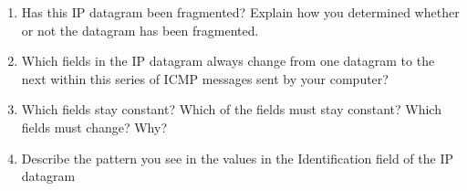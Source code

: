 \begin{enumerate}[label=\bfseries Problem \arabic*:,leftmargin=*,labelindent=1em]
        \item Has this IP datagram been fragmented? 
        Explain how you determined whether or not the datagram has been fragmented.\\[0.2mm]
        \soln
        \item Which fields in the IP datagram always change from one datagram to the next 
        within this series of ICMP messages sent by your computer?\\[0.2mm]
        \soln
        \item Which fields stay constant? Which of the fields must stay constant? 
        Which fields must change? Why?\\[0.2mm]
        \soln
        \item Describe the pattern you see in the values in the Identification field of the IP datagram\\[0.2mm]
        \soln

\end{enumerate}

